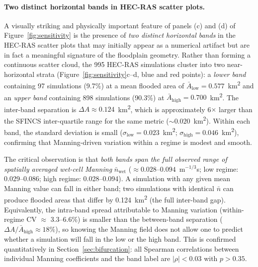 \documentclass[review,12pt]{elsarticle}
\newcommand{\sfincs}{\textsc{SFINCS}}
\newcommand{\hecras}{\textsc{HEC-RAS}}
\begin{document}
\paragraph{Two distinct horizontal bands in HEC-RAS scatter plots.}
A visually striking and physically important feature of panels (c) and (d) of
Figure~\ref{fig:sensitivity} is the presence of \emph{two distinct horizontal
bands} in the \hecras{} scatter plots that may initially appear as a
numerical artifact but are in fact a meaningful signature of the floodplain
geometry.
Rather than forming a continuous scatter cloud, the 995 \hecras{} simulations
cluster into two near-horizontal strata (Figure~\ref{fig:sensitivity}c--d,
blue and red points): a \emph{lower band} containing 97 simulations (9.7\%)
at a mean flooded area of $\bar{A}_{\mathrm{low}} = 0.577$~km\textsuperscript{2}
and an \emph{upper band} containing 898 simulations (90.3\%) at
$\bar{A}_{\mathrm{high}} = 0.700$~km\textsuperscript{2}.
The inter-band separation is $\Delta A \approx 0.124$~km\textsuperscript{2},
which is approximately 6$\times$ larger than the \sfincs{} inter-quartile
range for the same metric ($\sim 0.020$~km\textsuperscript{2}).
Within each band, the standard deviation is small ($\sigma_{\mathrm{low}}
= 0.023$~km\textsuperscript{2}; $\sigma_{\mathrm{high}} =
0.046$~km\textsuperscript{2}), confirming that Manning-driven variation within
a regime is modest and smooth.

The critical observation is that \emph{both bands span the full observed
range of spatially averaged wet-cell Manning} $\bar{n}_{\mathrm{wet}}$
($\approx 0.028$--$0.094$~m$^{-1/3}$s;
low regime: 0.029--0.086; high regime: 0.028--0.094).
A simulation with any given mean Manning value can fall in either band;
two simulations with identical $\bar{n}$ can produce flooded areas that
differ by 0.124~km\textsuperscript{2} (the full inter-band gap).
Equivalently, the intra-band spread attributable to Manning variation
(within-regime CV $\approx$ 3.3--6.6\%) is smaller than the between-band
separation ($\Delta A / \bar{A}_{\mathrm{high}} \approx 18\%$),
so knowing the Manning field does not allow one to predict whether a
simulation will fall in the low or the high band.
This is confirmed quantitatively in Section~\ref{sec:bifurcation}:
all Spearman correlations between individual Manning coefficients and the
band label are $|\rho| < 0.03$ with $p > 0.35$.
\end{document}
